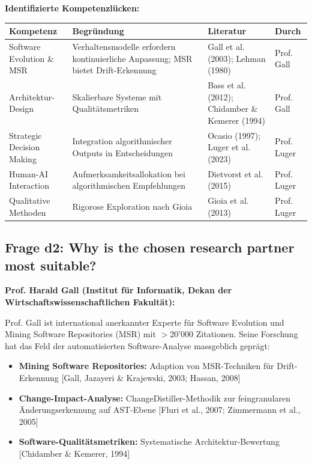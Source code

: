\documentclass[11pt,a4paper]{article}
\newcommand{\evidence}[1]{\textcolor{fehrgray}{[#1]}}
\begin{document}
\textbf{Identifizierte Kompetenzlücken:}

\begin{table}[h]
\centering
\begin{tabular}{@{}L{3cm}L{5cm}L{3.5cm}L{2cm}@{}}
\toprule
\textbf{Kompetenz} & \textbf{Begründung} & \textbf{Literatur} & \textbf{Durch} \\
\midrule
Software Evolution \& MSR & Verhaltensmodelle erfordern kontinuierliche Anpassung; MSR bietet Drift-Erkennung & Gall et al. (2003); Lehman (1980) & Prof. Gall \\
Architektur-Design & Skalierbare Systeme mit Qualitätsmetriken & Bass et al. (2012); Chidamber \& Kemerer (1994) & Prof. Gall \\
Strategic Decision Making & Integration algorithmischer Outputs in Entscheidungen & Ocasio (1997); Luger et al. (2023) & Prof. Luger \\
Human-AI Interaction & Aufmerksamkeitsallokation bei algorithmischen Empfehlungen & Dietvorst et al. (2015) & Prof. Luger \\
Qualitative Methoden & Rigorose Exploration nach Gioia & Gioia et al. (2013) & Prof. Luger \\
\bottomrule
\end{tabular}
\end{table}

\subsection{Frage d2: Why is the chosen research partner most suitable?}

\textbf{Prof. Harald Gall (Institut für Informatik, Dekan der Wirtschaftswissenschaftlichen Fakultät):}

Prof. Gall ist international anerkannter Experte für Software Evolution und Mining Software Repositories (MSR) mit $>$20'000 Zitationen. Seine Forschung hat das Feld der automatisierten Software-Analyse massgeblich geprägt:

\begin{itemize}[leftmargin=2em]
    \item \textbf{Mining Software Repositories:} Adaption von MSR-Techniken für Drift-Erkennung \evidence{Gall, Jazayeri \& Krajewski, 2003; Hassan, 2008}
    \item \textbf{Change-Impact-Analyse:} ChangeDistiller-Methodik zur feingranularen Änderungserkennung auf AST-Ebene \evidence{Fluri et al., 2007; Zimmermann et al., 2005}
    \item \textbf{Software-Qualitätsmetriken:} Systematische Architektur-Bewertung \evidence{Chidamber \& Kemerer, 1994}
\end{itemize}
\end{document}

